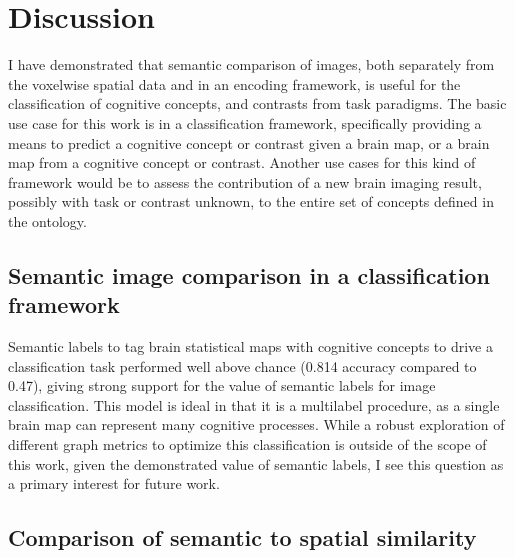 \documentclass{report}
\begin{document}
\section{Discussion}

I have demonstrated that semantic comparison of images, both separately
from the voxelwise spatial data and in an encoding framework, is useful
for the classification of cognitive concepts, and contrasts from task
paradigms. The basic use case for this work is in a classification
framework, specifically providing a means to predict a cognitive concept
or contrast given a brain map, or a brain map from a cognitive concept
or contrast. Another use cases for this kind of framework would be to
assess the contribution of a new brain imaging result, possibly with
task or contrast unknown, to the entire set of concepts defined in the
ontology.

\subsection{Semantic image comparison in a classification framework}

Semantic labels to tag brain statistical maps with cognitive concepts to
drive a classification task performed well above chance (0.814 accuracy
compared to 0.47), giving strong support for the value of semantic
labels for image classification. This model is ideal in that it is a
multilabel procedure, as a single brain map can represent many cognitive
processes. While a robust exploration of different graph metrics to
optimize this classification is outside of the scope of this work, given
the demonstrated value of semantic labels, I see this question as a
primary interest for future work.

\subsection{Comparison of semantic to spatial similarity}
\end{document}
